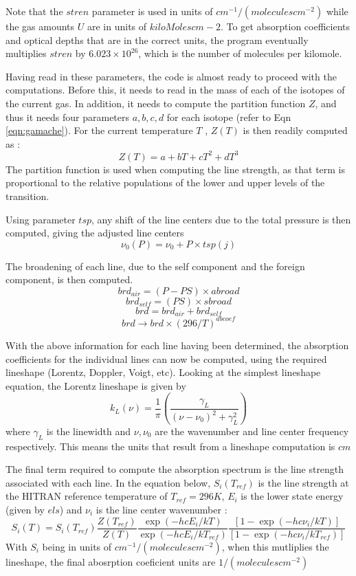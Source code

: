 \documentclass[11pt]{article}
\begin{document}
Note that the $stren$ parameter is used in units of 
$cm^{-1}/(moleculescm^{-2})$ while the gas amounts $U$ are in units of 
$kiloMolescm-2$. To get absorption coefficients and optical depths that 
are in the correct units, the program eventually multiplies $stren$ by 
$6.023 \times 10^{26}$, which is the number of molecules per kilomole. 

Having read in these parameters, the code is almost ready to proceed with 
the computations. Before this, it needs to read in the mass of each of the 
isotopes of the current gas. In addition, it needs to compute the 
partition function $Z$, and thus it needs four parameters $a, b, c, d$ for 
each isotope (refer to Eqn \ref{eqn:gamache}). For the current temperature 
$T$ , $Z(T)$ is then readily computed as : 
\[
Z(T ) = a + bT + cT^{2} + dT^{3}
\] 
The partition function is used when computing the line strength, as that 
term is proportional to the relative populations of the lower and upper 
levels of the transition. 

Using parameter $tsp$, any shift of the line centers due 
to the total pressure is then computed,  giving the adjusted line centers 
\[ 
\nu_{0}(P) = \nu_{0} + P \times tsp(j)
\]

The broadening of each line, due to the self component and the foreign 
component, is then computed. 
\[
brd_{air} = (P - PS) \times abroad
\]
\[
brd_{self} = (PS) \times sbroad
\]
\[
brd = brd_{air} + brd_{self}
\]
\[
brd \rightarrow brd \times (296/T)^{abcoef}
\]

With the above information for each line having been determined, the 
absorption coefficients for the individual lines can now be computed, 
using the required lineshape (Lorentz, Doppler, Voigt, etc). Looking at 
the simplest lineshape equation, the Lorentz lineshape is given by 
\[
 k_{L}(\nu)=\frac{1}{\pi}\left(\frac{\gamma_{L}}
{(\nu-\nu_{0})^{2}+\gamma_{L}^{2}}\right)
\]
where $\gamma_{L}$ is the linewidth and $\nu,\nu_{0}$ are the wavenumber
and line center frequency respectively. This means the units that result
from a lineshape computation is $cm$

The final term required to compute the absorption spectrum is the line
strength associated with each line. In the equation below, $S_{i}(T_{ref})$ 
is the line strength at the HITRAN reference temperature of $T_{ref} = 296K$, 
$E_{i}$ is the lower state energy (given by $els$) and $\nu_{i}$ is the line 
center wavenumber : 
\[
 S_i (T) = S_i (T_{ref})
 \frac{ Z(T_{ref}) }{ Z(T) }
 \frac{ \exp(-hcE_i /kT) }{ \exp(-hcE_i /kT_{ref}) }
 \frac{ [1-\exp(-hc\nu_i /kT)] }{ [1-\exp(-hc\nu_i /kT_{ref})] }
\]
With $S_{i}$ being in units of $cm^{-1}/(molecules cm^{-2})$, when this
mutliplies the lineshape, the final abosrption coeficient units are 
 $1/(molecules cm^{-2}) $
 
\end{document}
